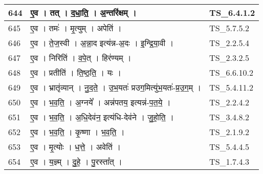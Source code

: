 \documentclass[17pt]{extarticle}
\begin{document}
\begin{longtable}{||p{0.4in}||p{4.9in}||p{0.9in}||}
    644 & ए॒व   ।   तत्   ।   द॒धा॒ति॒   ।   अ॒न्तरि॑क्षम्   ।    & TS\_6.4.1.2       \\
    
    \hline
        
    645 & ए॒व   ।   तमः॑   ।   मृ॒त्युम्   ।   अपेति॑   ।    & TS\_5.7.5.2       \\
    
    \hline
        
    646 & ए॒व   ।   ते॒ज॒स्वी   ।   अ॒न्ना॒द इत्य॑न्न{-}अ॒दः   ।   इ॒न्द्रि॒या॒वी   ।    & TS\_2.2.5.4       \\
    
    \hline
        
    647 & ए॒व   ।   निरिति॑   ।   व॒पे॒त्   ।   हिर॑ण्यम्   ।    & TS\_2.3.2.5       \\
    
    \hline
        
    648 & ए॒व   ।   प्रतीति॑   ।   ति॒ष्ठ॒ति॒   ।   यः   ।    & TS\_6.6.10.2       \\
    
    \hline
        
    649 & ए॒व   ।   भ्रातृ॑व्यान्   ।   नु॒द॒ते॒   ।   उ॒भ॒यतः॑ प्र‌उग॒मित्यु॑भ॒यतः॑{-}प्र॒उ॒ग॒म्   ।    & TS\_5.4.11.2       \\
    
    \hline
        
    650 & ए॒व   ।   भ॒व॒ति॒   ।   अ॒ग्नये᳚   ।   अन्न॑पतय॒ इत्यन्न॑{-}प॒त॒ये॒   ।    & TS\_2.2.4.2       \\
    
    \hline
        
    651 & ए॒व   ।   भ॒व॒ति॒   ।   अ॒धि॒देव॑न॒ इत्य॑धि{-}देव॑ने   ।   जु॒हो॒ति॒   ।    & TS\_3.4.8.2       \\
    
    \hline
        
    652 & ए॒व   ।   भ॒व॒ति॒   ।   कृ॒ष्णा   ।   भ॒व॒ति॒   ।    & TS\_2.1.9.2       \\
    
    \hline
        
    653 & ए॒व   ।   मृ॒त्योः   ।   ध॒त्ते॒   ।   अवेति॑   ।    & TS\_5.4.4.5       \\
    
    \hline
        
    654 & ए॒व   ।   य॒ज्ञ्म्   ।   दु॒हे॒   ।   पु॒रस्ता᳚त्   ।    & TS\_1.7.4.3       \\
    

\end{longtable}
\end{document}
